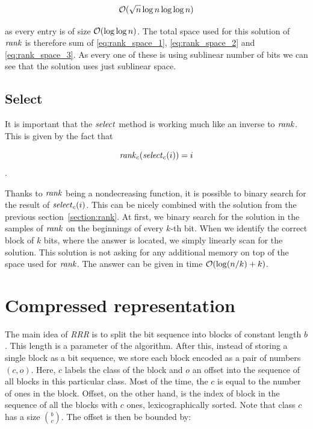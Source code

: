\begin{equation}
    \mathcal{O}(\sqrt{n}\log n\log\log n)
    \label{eq:rank_space_3}
\end{equation}

as every entry is of size $\mathcal{O}(\log\log n)$. The total space used for this solution of $\mathit{rank}$
is therefore sum of \ref{eq:rank_space_1}, \ref{eq:rank_space_2} and \ref{eq:rank_space_3}.
As every one of these is using sublinear number of bits we can see that the solution uses just
sublinear space.


\subsection{Select}
\label{section:select}

It is important that the $\mathit{select}$ method is working much like an inverse to $\mathit{rank}$. This is given
by the fact that

                $$\mathit{rank}_c(\mathit{select}_c(i)) = i$$.

Thanks to $\mathit{rank}$ being a nondecreasing function, it is possible to binary search for the result
of $\mathit{select}_c(i)$. This can be nicely combined with the solution from the previous
section~\ref{section:rank}. At first, we binary search for the solution in the samples of $\mathit{rank}$
on the beginnings of every $k$-th bit. When we identify the correct block of $k$ bits, where
the answer is located, we simply linearly scan for the solution. This solution is not asking
for any additional memory on top of the space used for $\mathit{rank}$. The answer can be given in time
$\mathcal{O}(\log(n/k)+k)$.


\section{Compressed representation}
\label{section:compressed_bv}

The main idea of \textit{RRR} is to split the bit sequence into blocks of constant length $b$.
This length is a parameter of the algorithm. After this, instead
of storing a single block as a bit sequence, we store each block encoded as a pair
of numbers $(c, o)$. Here, $c$ labels the class of the block and $o$ an offset into
the sequence of all blocks in this particular class. Most of the time, the $c$ is equal
to the number of ones in the block. Offset, on the other hand, is the index of block in
the sequence of all the blocks with $c$ ones, lexicographically sorted. Note that
class $c$ has a size ${b\choose c}$. The offset is then be bounded by:

